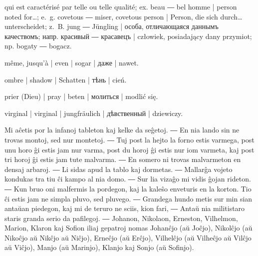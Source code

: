 \begin{ekzvocab}{1em}
 qui est caractérisé par telle ou telle qualité; ex.  beau ―  bel homme | person noted for\ldots{}; e.~g.  covetous ―  miser, covetous person | Person, die sich durch\ldots{} unterscheidet; z.~B.  jung ―  Jüngling | особа, отличающаяся даннымъ качествомъ; напр.  красивый ―  красавецъ | człowiek, posiadający dany przymiot; np.  bogaty ―  bogacz.

 même, jusqu’à | even | sogar | даже | nawet.

 ombre | shadow | Schatten | тѣнь | cień.

 prier (Dieu) | pray | beten | молиться | modlić się.

 virginal | virginal | jungfräulich | дѣвственный | dziewiczy.

\end{ekzvocab}



Mi aĉetis por la infanoj tableton kaj kelke da seĝetoj. ― En nia lando sin ne trovas montoj, sed nur montetoj. ― Tuj post la hejto la forno estis varmega, post unu horo ĝi estis jam nur varma, post du horoj ĝi estis nur iom varmeta, kaj post tri horoj ĝi estis jam tute malvarma. ― En somero ni trovas malvarmeton en densaj arbaroj. ― Li sidas apud la tablo kaj dormetas. ― Mallarĝa vojeto kondukas tra tiu ĉi kampo al nia domo. ― Sur lia vizaĝo mi vidis ĝojan rideton. ― Kun bruo oni malfermis la pordegon, kaj la kaleŝo enveturis en la korton. Tio ĉi estis jam ne simpla pluvo, sed pluvego. ― Grandega hundo metis sur min sian antaŭan piedegon, kaj mi de teruro ne sciis, kion fari, ― Antaŭ nia militistaro staris granda serio da pafilegoj. ― Johanon, Nikolaon, Erneston, Vilhelmon, Marion, Klaron kaj Sofion iliaj gepatroj nomas Johanĉjo (aŭ Joĉjo), Nikolĉjo (aŭ Nikoĉjo aŭ Nikĉjo aŭ Niĉjo), Erneĉjo (aŭ Erĉjo), Vilhelĉjo (aŭ Vilheĉjo aŭ Vilĉjo aŭ Viĉjo), Manjo (aŭ Marinjo), Klanjo kaj Sonjo (aŭ Sofinjo).

